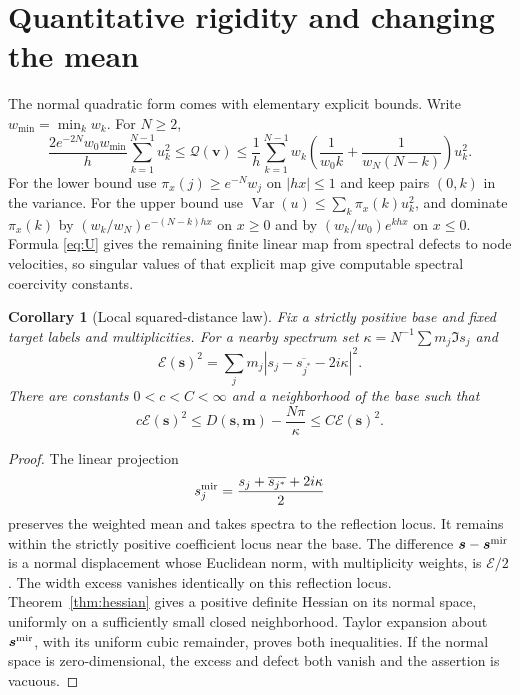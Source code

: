 \documentclass[11pt]{article}
\newtheorem{corollary}[theorem]{Corollary}
\theoremstyle{remark}\newtheorem{remark}[theorem]{Remark}
\DeclareMathOperator{\Var}{Var}
\begin{document}
\section{Quantitative rigidity and changing the mean}

The normal quadratic form comes with elementary explicit bounds. Write $w_{\min}=\min_kw_k$. For $N\ge2$,
\begin{equation}\label{eq:coercivity}
 \frac{2e^{-2N}w_0w_{\min}}{h}\sum_{k=1}^{N-1}u_k^2
 \le\mathcal Q(\boldsymbol v)
 \le\frac1h\sum_{k=1}^{N-1}w_k
 \left(\frac1{w_0k}+\frac1{w_N(N-k)}\right)u_k^2.
\end{equation}
For the lower bound use $\pi_x(j)\ge e^{-N}w_j$ on $|hx|\le1$ and keep pairs $(0,k)$ in the variance. For the upper bound use $\Var(u)\le\sum_k\pi_x(k)u_k^2$, and dominate $\pi_x(k)$ by $(w_k/w_N)e^{-(N-k)hx}$ on $x\ge0$ and by $(w_k/w_0)e^{khx}$ on $x\le0$. Formula \eqref{eq:U} gives the remaining finite linear map from spectral defects to node velocities, so singular values of that explicit map give computable spectral coercivity constants.

\begin{corollary}[Local squared-distance law]\label{cor:rigidity}
Fix a strictly positive base and fixed target labels and multiplicities. For a nearby spectrum set $\kappa=N^{-1}\sum m_j\Im s_j$ and
\[
 \mathcal E(\boldsymbol s)^2
 =\sum_jm_j|s_j-\overline{s_{j^*}}-2i\kappa|^2.
\]
There are constants $0<c<C<\infty$ and a neighborhood of the base such that
\[
 c\mathcal E(\boldsymbol s)^2
 \le D(\boldsymbol s,\boldsymbol m)-\frac{N\pi}{\kappa}
 \le C\mathcal E(\boldsymbol s)^2.
\]
\end{corollary}
\begin{proof}
The linear projection
\[
 s_j^{\rm mir}=\frac{s_j+\overline{s_{j^*}}+2i\kappa}{2}
\]
preserves the weighted mean and takes spectra to the reflection locus. It remains within the strictly positive coefficient locus near the base. The difference $\boldsymbol s-\boldsymbol s^{\rm mir}$ is a normal displacement whose Euclidean norm, with multiplicity weights, is $\mathcal E/2$. The width excess vanishes identically on this reflection locus. Theorem~\ref{thm:hessian} gives a positive definite Hessian on its normal space, uniformly on a sufficiently small closed neighborhood. Taylor expansion about $\boldsymbol s^{\rm mir}$, with its uniform cubic remainder, proves both inequalities. If the normal space is zero-dimensional, the excess and defect both vanish and the assertion is vacuous.
\end{proof}
\end{document}
